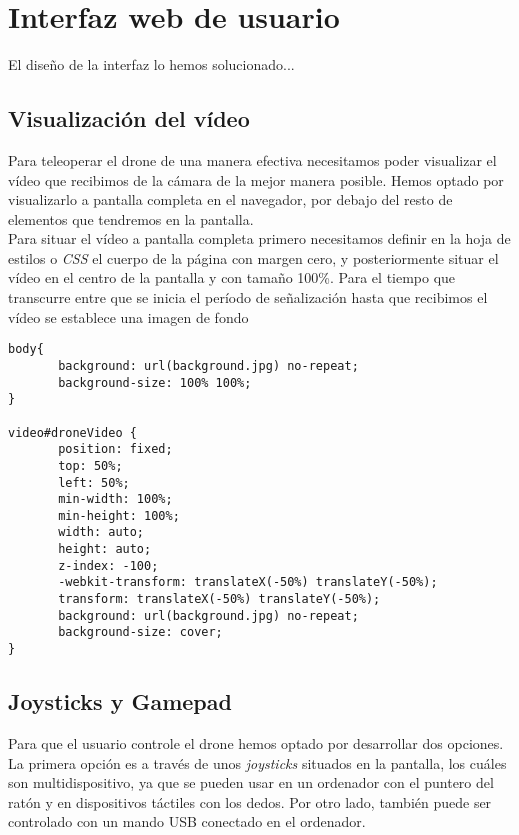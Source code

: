 \section{Interfaz web de usuario}

El diseño de la interfaz lo hemos solucionado...

\subsection{Visualización del vídeo}

Para teleoperar el drone de una manera efectiva necesitamos poder visualizar el vídeo que recibimos de la cámara de la mejor manera posible. Hemos optado por visualizarlo a pantalla completa en el navegador, por debajo del resto de elementos que tendremos en la pantalla.\\

Para situar el vídeo a pantalla completa primero necesitamos definir en la hoja de estilos o \emph{CSS} el cuerpo de la página con margen cero, y posteriormente situar el vídeo en el centro de la pantalla y con tamaño 100\%. Para el tiempo que transcurre entre que se inicia el período de señalización hasta que recibimos el vídeo se establece una imagen de fondo\\

\begin{lstlisting}[caption=Vídeo a pantalla completa.]
body{
       background: url(background.jpg) no-repeat;
       background-size: 100% 100%;
}

video#droneVideo { 
       position: fixed;
       top: 50%;
       left: 50%;
       min-width: 100%;
       min-height: 100%;
       width: auto;
       height: auto;
       z-index: -100;
       -webkit-transform: translateX(-50%) translateY(-50%);
       transform: translateX(-50%) translateY(-50%);
       background: url(background.jpg) no-repeat;
       background-size: cover; 
}
\end{lstlisting}

\subsection{Joysticks y Gamepad}\label{subsec:joysticks}

Para que el usuario controle el drone hemos optado por desarrollar dos opciones. La primera opción es a través de unos \emph{joysticks} situados en la pantalla, los cuáles son multidispositivo, ya que se pueden usar en un ordenador con el puntero del ratón y en dispositivos táctiles con los dedos. Por otro lado, también puede ser controlado con un mando USB conectado en el ordenador.\\

